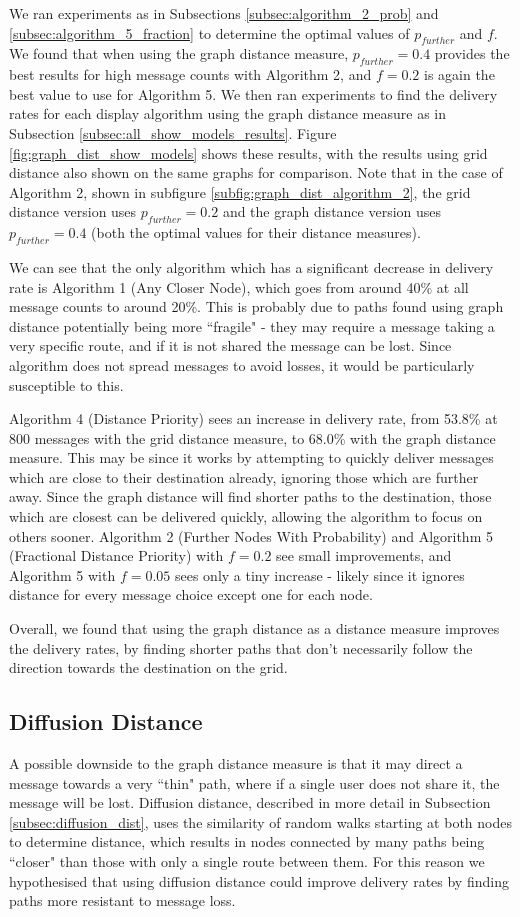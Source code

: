 \documentclass[bsc,frontabs,twoside,singlespacing,parskip,deptreport]{infthesis}     %
\begin{document}
We ran experiments as in Subsections \ref{subsec:algorithm_2_prob} and \ref{subsec:algorithm_5_fraction} to determine the optimal values of $p_{further}$ and $f$. We found that when using the graph distance measure, $p_{further}=0.4$ provides the best results for high message counts with Algorithm 2, and $f=0.2$ is again the best value to use for Algorithm 5. We then ran experiments to find the delivery rates for each display algorithm using the graph distance measure as in Subsection \ref{subsec:all_show_models_results}. Figure \ref{fig:graph_dist_show_models} shows these results, with the results using grid distance also shown on the same graphs for comparison. Note that in the case of Algorithm 2, shown in subfigure \ref{subfig:graph_dist_algorithm_2}, the grid distance version uses $p_{further}=0.2$ and the graph distance version uses $p_{further}=0.4$ (both the optimal values for their distance measures).

We can see that the only algorithm which has a significant decrease in delivery rate is Algorithm 1 (Any Closer Node), which goes from around 40\% at all message counts to around 20\%. This is probably due to paths found using graph distance potentially being more ``fragile" - they may require a message taking a very specific route, and if it is not shared the message can be lost. Since algorithm does not spread messages to avoid losses, it would be particularly susceptible to this.

Algorithm 4 (Distance Priority) sees an increase in delivery rate, from 53.8\% at 800 messages with the grid distance measure, to 68.0\% with the graph distance measure. This may be since it works by attempting to quickly deliver messages which are close to their destination already, ignoring those which are further away. Since the graph distance will find shorter paths to the destination, those which are closest can be delivered quickly, allowing the algorithm to focus on others sooner. Algorithm 2 (Further Nodes With Probability) and Algorithm 5 (Fractional Distance Priority) with $f=0.2$ see small improvements, and Algorithm 5 with $f=0.05$ sees only a tiny increase - likely since it ignores distance for every message choice except one for each node.

Overall, we found that using the graph distance as a distance measure improves the delivery rates, by finding shorter paths that don't necessarily follow the direction towards the destination on the grid.

\subsection{Diffusion Distance}
A possible downside to the graph distance measure is that it may direct a message towards a very ``thin" path, where if a single user does not share it, the message will be lost. Diffusion distance, described in more detail in Subsection \ref{subsec:diffusion_dist}, uses the similarity of random walks starting at both nodes to determine distance, which results in nodes connected by many paths being ``closer" than those with only a single route between them. For this reason we hypothesised that using diffusion distance could improve delivery rates by finding paths more resistant to message loss.
\end{document}
